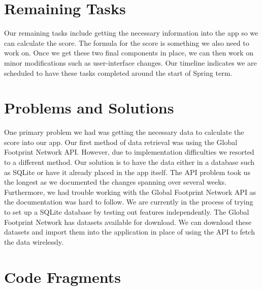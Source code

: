 \documentclass[onecolumn, draftclsnofoot,10pt, compsoc, tikz]{IEEEtran}
\begin{document}
\section{Remaining Tasks}
Our remaining tasks include getting the necessary information into the app so we can calculate the score. The formula for the score is something we also need to work on. Once we get these two final components in place, we can then work on minor modifications such as user-interface changes. Our timeline indicates we are scheduled to have these tasks completed around the start of Spring term. 

\section{Problems and Solutions}
One primary problem we had was getting the necessary data to calculate the score into our app. Our first method of data retrieval was using the Global Footprint Network API. However, due to implementation difficulties we resorted to a different method. Our solution is to have the data either in a database such as SQLite or have it already placed in the app itself. The API problem took us the longest as we documented the changes spanning over several weeks.
Furthermore, we had trouble working with the Global Footprint Network API as the documentation was hard to follow. We are currently in the process of trying to set up a SQLite database by testing out features independently. The Global Footprint Network has datasets available for download. We can download these datasets and import them into the application in place of using the API to fetch the data wirelessly.


\clearpage

\section{Code Fragments}

\end{document}
